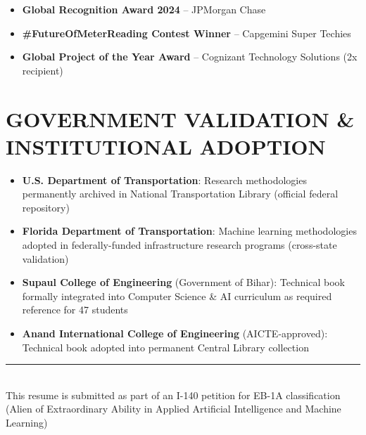 \documentclass[11pt]{article}
\begin{document}
\begin{itemize}
    \item \textbf{Global Recognition Award 2024} -- JPMorgan Chase
    \item \textbf{\#FutureOfMeterReading Contest Winner} -- Capgemini Super Techies
    \item \textbf{Global Project of the Year Award} -- Cognizant Technology Solutions (2x recipient)
\end{itemize}

\section*{GOVERNMENT VALIDATION \& INSTITUTIONAL ADOPTION}

\begin{itemize}
    \item \textbf{U.S. Department of Transportation}: Research methodologies permanently archived in National Transportation Library (official federal repository)
    \item \textbf{Florida Department of Transportation}: Machine learning methodologies adopted in federally-funded infrastructure research programs (cross-state validation)
    \item \textbf{Supaul College of Engineering} (Government of Bihar): Technical book formally integrated into Computer Science \& AI curriculum as required reference for 47 students
    \item \textbf{Anand International College of Engineering} (AICTE-approved): Technical book adopted into permanent Central Library collection
\end{itemize}

\vfill

\begin{center}
\rule{0.5\textwidth}{0.4pt}\\
This resume is submitted as part of an I-140 petition for EB-1A classification\\
(Alien of Extraordinary Ability in Applied Artificial Intelligence and Machine Learning)
\end{center}
\end{document}
